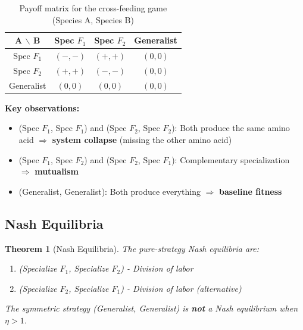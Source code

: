 \documentclass[11pt]{article}
\newtheorem{theorem}{Theorem}
\theoremstyle{definition}
\theoremstyle{remark}
\begin{document}
\begin{table}[h]
\centering
\caption{Payoff matrix for the cross-feeding game (Species A, Species B)}
\label{tab:payoff}
\begin{tabular}{c|ccc}
\toprule
A $\backslash$ B & Spec $F_1$ & Spec $F_2$ & Generalist \\
\midrule
Spec $F_1$ & $(-, -)$ & $(\mathbf{+}, \mathbf{+})$ & $(0, 0)$ \\
Spec $F_2$ & $(\mathbf{+}, \mathbf{+})$ & $(-, -)$ & $(0, 0)$ \\
Generalist & $(0, 0)$ & $(0, 0)$ & $(0, 0)$ \\
\bottomrule
\end{tabular}
\end{table}

\textbf{Key observations:}
\begin{itemize}
    \item (Spec $F_1$, Spec $F_1$) and (Spec $F_2$, Spec $F_2$): Both produce the same amino acid $\Rightarrow$ \textbf{system collapse} (missing the other amino acid)
    \item (Spec $F_1$, Spec $F_2$) and (Spec $F_2$, Spec $F_1$): Complementary specialization $\Rightarrow$ \textbf{mutualism}
    \item (Generalist, Generalist): Both produce everything $\Rightarrow$ \textbf{baseline fitness}
\end{itemize}

\subsection{Nash Equilibria}

\begin{theorem}[Nash Equilibria]
The pure-strategy Nash equilibria are:
\begin{enumerate}
    \item (Specialize $F_1$, Specialize $F_2$) - Division of labor
    \item (Specialize $F_2$, Specialize $F_1$) - Division of labor (alternative)
\end{enumerate}

The symmetric strategy (Generalist, Generalist) is \textbf{not} a Nash equilibrium when $\eta > 1$.
\end{theorem}
\end{document}
